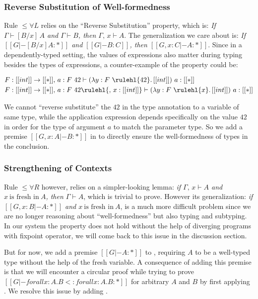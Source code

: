 \subsubsection{Reverse Substitution of Well-formedness}

Rule $\le\forall L$ relies on the ``Reverse Substitution'' property, which is:
\emph{If $\Gamma \vdash [B / x] \, A$ and $\Gamma \vdash B$, then $\Gamma,\, x \vdash A$}.
The generalization we care about is:
\emph{If $[[G |- [B / x] A : *]]$ and $[[G |- B : C]]$, then $[[G , x : C |- A : *]]$}.
Since in a dependently-typed setting, the values of expressions also matter during typing
besides the types of expressions, a counter-example of the property could be:

\begin{align*}
& F : [[int]] \rightarrow [[*]],\, a : F~42 \vdash (\lambda y : F~\rulehl{42}.\, [[int]]) ~ a : [[*]] \\
& F : [[int]] \rightarrow [[*]],\, a : F~42\rulehl{,\, x : [[int]]} \vdash (\lambda y : F~\rulehl{x}.\, [[int]]) ~ a : [[*]]
\end{align*}

We cannot ``reverse substitute'' the $42$ in the type annotation to a variable
of same type, while the application expression depends specifically on the value
$42$ in order for the type of argument $a$ to match the parameter type.
So we add a premise $[[G , x : A |- B : *]]$ in  to directly
ensure the well-formedness of types in the conclusion.

\subsubsection{Strengthening of Contexts}

Rule $\le\forall R$ however, relies on a simpler-looking lemma:
\emph{if $\Gamma,\, x \vdash A$ and $x ~\text{is fresh in}~ A$, then $\Gamma \vdash A$}, which
is trivial to prove. However its generalization:
\emph{if $[[G, x : B |- A : *]]$ and $x ~\text{is fresh in}~ A$},
is a much more difficult problem since we are no longer reasoning about
``well-formedness'' but also typing and subtyping. In our system the property
does not hold without the help of diverging programs with fixpoint operator,
we will come back to this issue in the discussion section.

But for now, we add a premise $[[G |- A : *]]$ to ,
requiring $A$ to be a well-typed type without the help of the fresh variable.
A consequence of adding this premise is that we will encounter a circular proof
while trying to prove $[[G |- forall x : A. B <: forall x : A . B : *]]$ for
arbitrary $A$ and $B$ by first applying . We resolve this issue by
adding .

